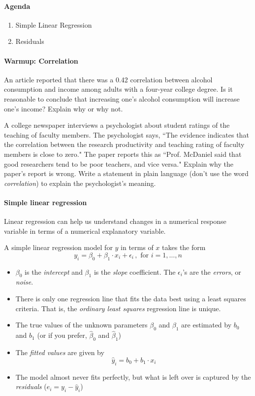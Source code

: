 \documentclass[10pt]{article}\usepackage[]{graphicx}\usepackage[]{color}
\begin{document}
\paragraph{Agenda}
\begin{enumerate}
  \itemsep0em
  \item Simple Linear Regression
  \item Residuals
\end{enumerate}


\paragraph{Warmup: Correlation}
An article reported that there was a 0.42 correlation between alcohol consumption and income among adults with a four-year college degree. Is it reasonable to conclude that increasing one's alcohol consumption will increase one's income? Explain why or why not. 

\vspace{1in}

A college newspaper interviews a psychologist about student ratings of the teaching of faculty members. The psychologist says, ``The evidence indicates that the correlation between the research productivity and teaching rating of faculty members is close to zero." The paper reports this as ``Prof. McDaniel said that good researchers tend to be poor teachers, and vice versa." Explain why the paper's report is wrong. Write a statement in plain language (don't use the word \emph{correlation}) to explain the psychologist's meaning. 

\vspace{1in}

\paragraph{Simple linear regression}
Linear regression can help us understand changes in a numerical response variable in terms of a numerical explanatory variable. 

A simple linear regression model for $y$ in terms of $x$ takes the form
$$
  y_i = \beta_0 + \beta_1 \cdot x_i + \epsilon_i \,, \text{ for } i=1,\ldots,n
$$
\begin{itemize}
  \itemsep0in
  \item $\beta_0$ is the \emph{intercept} and $\beta_1$ is the \emph{slope} coefficient. The $\epsilon_i$'s are the \emph{errors}, or \emph{noise}.
  \item There is only one regression line that fits the data best using a least squares criteria. That is, the \emph{ordinary least squares} regression line is unique.
  \item The true values of the unknown parameters $\beta_0$ and $\beta_1$ are estimated by $b_0$ and $b_1$ (or if you prefer, $\hat{\beta}_0$ and $\hat{\beta}_1$)
  \item The \emph{fitted values} are given by 
  $$
    \hat{y}_i = b_0 + b_1 \cdot x_i
  $$
  \item The model almost never fits perfectly, but what is left over is captured by the \emph{residuals} ($e_i = y_i - \hat{y}_i$)

\end{itemize}
\end{document}
